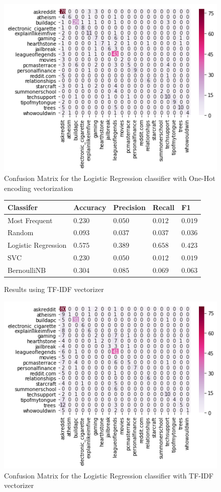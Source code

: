 \documentclass[10pt, a4paper]{article}
\begin{document}
\begin{figure}[H]
	\caption{Confusion Matrix for the Logistic Regression classifier with One-Hot encoding vectorization}
	\begin{center}
		\includegraphics[width=.6\linewidth]{q1_one_hot}
	\end{center}
	\label{fig:one_hot_mat}
\end{figure}

\begin{figure}[H]
	\caption{Results using TF-IDF vectorizer}
	\begin{center}
		\begin{tabulary}{\textwidth}{|L|L|L|L|L|}
			\hline
			Classifer           & Accuracy  & Precision & Recall    & F1        \\
			\hline
			Most Frequent       & \(0.230\) & \(0.050\) & \(0.012\) & \(0.019\) \\
			Random              & \(0.093\) & \(0.037\) & \(0.037\) & \(0.036\) \\
			Logistic Regression & \(0.575\) & \(0.389\) & \(0.658\) & \(0.423\) \\
			SVC                 & \(0.230\) & \(0.050\) & \(0.012\) & \(0.019\) \\
			BernoulliNB         & \(0.304\) & \(0.085\) & \(0.069\) & \(0.063\) \\
			\hline
		\end{tabulary}
	\end{center}
	\label{fig:tfidf}
\end{figure}

\begin{figure}[H]
	\caption{Confusion Matrix for the Logistic Regression classifier with TF-IDF vectorizer}
	\begin{center}
		\includegraphics[width=.6\linewidth]{q1_tfidf}
	\end{center}
	\label{fig:tfidf_mat}
\end{figure}
\end{document}

